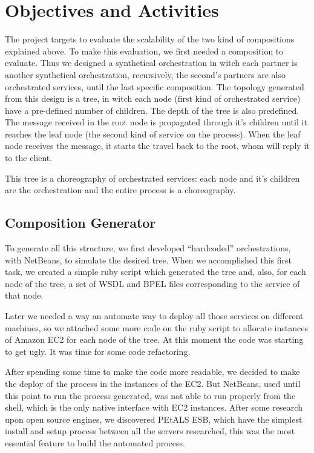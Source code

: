 \section{Objectives and Activities}

The project targets to evaluate the scalability of the two kind of compositions explained above. To make this evaluation, we first needed a composition to evaluate. Thus we designed a synthetical orchestration in witch each partner is another synthetical orchestration, recursively, the second's partners are also orchestrated services, until the last specific composition. The topology generated from this design is a tree, in witch each node (first kind of orchestrated service) have a pre-defined number of children. The depth of the tree is also predefined. The message received in the root node is propagated through it's children until it reaches the leaf node (the second kind of service on the process). When the leaf node receives the message, it starts the travel back to the root, whom will reply it to the client.

This tree is a choreography of orchestrated services: each node and it's children are the orchestration and the entire process is a choreography.

\subsection{Composition Generator}
To generate all this structure, we first developed ``hardcoded'' orchestrations, with NetBeans, to simulate the desired tree. When we accomplished this first task, we created a simple ruby script which generated the tree and, also, for each node of the tree, a set of WSDL and BPEL files corresponding to the service of that node.

Later we needed a way an automate way to deploy all those services on different machines, so we attached some more code on the ruby script to allocate instances of Amazon EC2 for each node of the tree. At this moment the code was starting to get ugly. It was time for some code refactoring.

After spending some time to make the code more readable, we decided to make the deploy of the process in the instances of the EC2. But NetBeans, used until this point to run the process generated, was not able to run properly from the shell, which is the only native interface with EC2 instances. After some research upon open source engines, we discovered PEtALS ESB, which have the simplest install and setup process between all the servers researched, this was the most essential feature to build the automated process.

